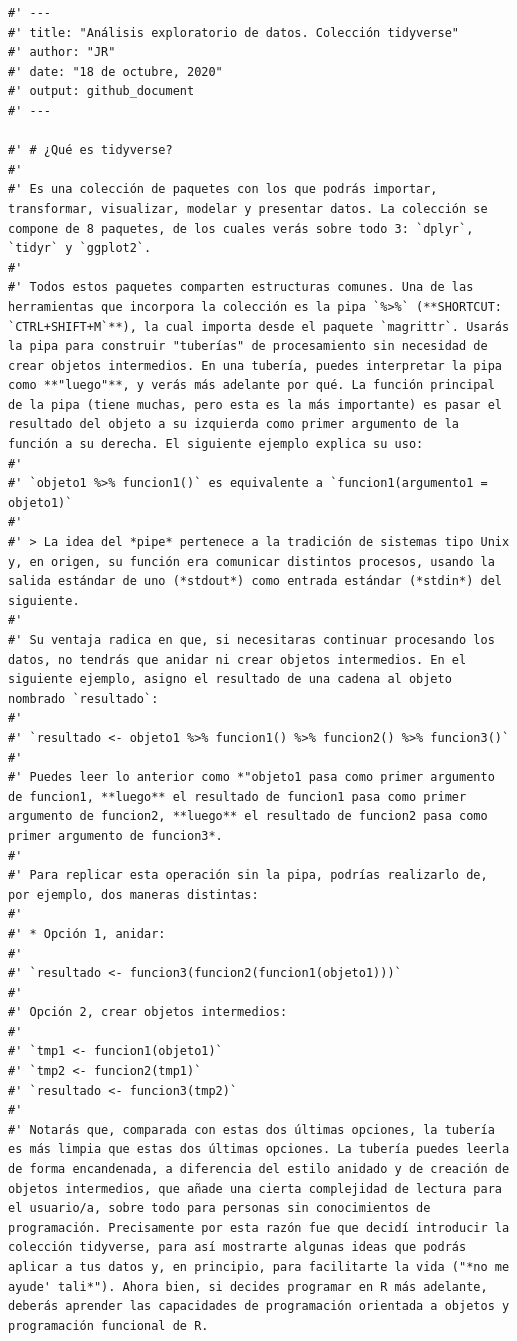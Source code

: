 \documentclass[11pt,]{article}
\begin{document}
\begin{verbatim}
#' ---
#' title: "Análisis exploratorio de datos. Colección tidyverse"
#' author: "JR"
#' date: "18 de octubre, 2020"
#' output: github_document
#' ---

#' # ¿Qué es tidyverse?
#' 
#' Es una colección de paquetes con los que podrás importar, transformar, visualizar, modelar y presentar datos. La colección se compone de 8 paquetes, de los cuales verás sobre todo 3: `dplyr`, `tidyr` y `ggplot2`.
#' 
#' Todos estos paquetes comparten estructuras comunes. Una de las herramientas que incorpora la colección es la pipa `%>%` (**SHORTCUT: `CTRL+SHIFT+M`**), la cual importa desde el paquete `magrittr`. Usarás la pipa para construir "tuberías" de procesamiento sin necesidad de crear objetos intermedios. En una tubería, puedes interpretar la pipa como **"luego"**, y verás más adelante por qué. La función principal de la pipa (tiene muchas, pero esta es la más importante) es pasar el resultado del objeto a su izquierda como primer argumento de la función a su derecha. El siguiente ejemplo explica su uso:
#' 
#' `objeto1 %>% funcion1()` es equivalente a `funcion1(argumento1 = objeto1)`
#' 
#' > La idea del *pipe* pertenece a la tradición de sistemas tipo Unix y, en origen, su función era comunicar distintos procesos, usando la salida estándar de uno (*stdout*) como entrada estándar (*stdin*) del siguiente.
#' 
#' Su ventaja radica en que, si necesitaras continuar procesando los datos, no tendrás que anidar ni crear objetos intermedios. En el siguiente ejemplo, asigno el resultado de una cadena al objeto nombrado `resultado`:
#' 
#' `resultado <- objeto1 %>% funcion1() %>% funcion2() %>% funcion3()`
#' 
#' Puedes leer lo anterior como *"objeto1 pasa como primer argumento de funcion1, **luego** el resultado de funcion1 pasa como primer argumento de funcion2, **luego** el resultado de funcion2 pasa como primer argumento de funcion3*.
#' 
#' Para replicar esta operación sin la pipa, podrías realizarlo de, por ejemplo, dos maneras distintas:
#' 
#' * Opción 1, anidar:
#' 
#' `resultado <- funcion3(funcion2(funcion1(objeto1)))`
#' 
#' Opción 2, crear objetos intermedios:
#' 
#' `tmp1 <- funcion1(objeto1)`
#' `tmp2 <- funcion2(tmp1)`
#' `resultado <- funcion3(tmp2)`
#' 
#' Notarás que, comparada con estas dos últimas opciones, la tubería es más limpia que estas dos últimas opciones. La tubería puedes leerla de forma encandenada, a diferencia del estilo anidado y de creación de objetos intermedios, que añade una cierta complejidad de lectura para el usuario/a, sobre todo para personas sin conocimientos de programación. Precisamente por esta razón fue que decidí introducir la colección tidyverse, para así mostrarte algunas ideas que podrás aplicar a tus datos y, en principio, para facilitarte la vida ("*no me ayude' tali*"). Ahora bien, si decides programar en R más adelante, deberás aprender las capacidades de programación orientada a objetos y programación funcional de R.

\end{verbatim}
\end{document}
